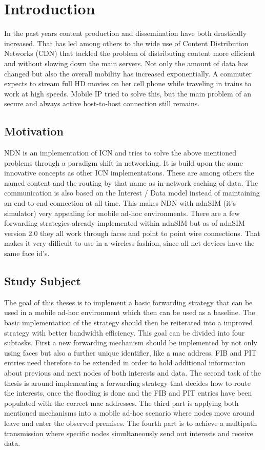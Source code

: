 \chapter{Introduction}

In the past years content production and dissemination have both drastically increased. That has led among others to the wide use of Content Distribution Networks (CDN) that tackled the problem of distributing content more efficient and without slowing down the main servers. Not only the amount of data has changed but also the overall mobility has increased exponentially. A commuter expects to stream full HD movies on her cell phone while traveling in trains to work at high speeds. Mobile IP tried to solve this, but the main problem of an secure and always active host-to-host connection still remains.

\section{Motivation}

NDN is an implementation of ICN and tries to solve the above mentioned problems through a paradigm shift in networking. It is build upon the same innovative concepts as other ICN implementations. These are among others the named content and the routing by that name as in-network caching of data. The communication is also based on the Interest / Data model instead of maintaining an end-to-end connection at all time. This makes NDN with ndnSIM (it's simulator) very appealing for mobile ad-hoc environments. There are a few forwarding strategies already implemented within ndnSIM but as of ndnSIM version 2.0 they all work through faces and point to point wire connections. That makes it very difficult to use in a wireless fashion, since all net devices have the same face id's.

\section{Study Subject}

The goal of this theses is to implement a basic forwarding strategy that can be used in a mobile ad-hoc environment which then can be used as a baseline. The basic implementation of the strategy should then be reiterated into a improved strategy with better bandwidth efficiency. This goal can be divided into four subtasks. First a new forwarding mechanism should be implemented by not only using faces but also a further unique identifier, like a mac address. FIB and PIT entries need therefore to be extended in order to hold additional information about previous and next nodes of both interests and data. The second task of the thesis is around implementing a forwarding strategy that decides how to route the interests, once the flooding is done and the FIB and PIT entries have been populated with the correct mac addresses. The third part is applying both mentioned mechanisms into a mobile ad-hoc scenario where nodes move around leave and enter the observed premises. The fourth part is to achieve a multipath transmission where specific nodes simultaneously send out interests and receive data.

